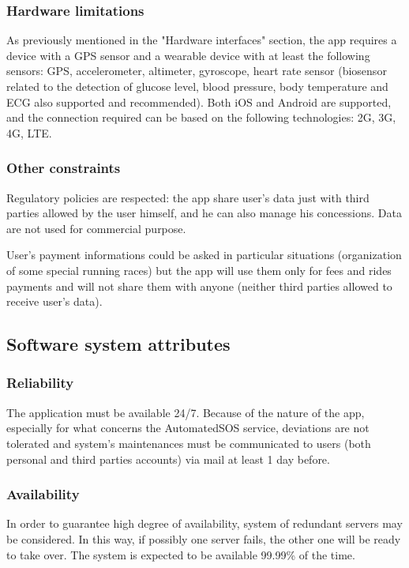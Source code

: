 \subsubsection{Hardware limitations}
As previously mentioned in the "Hardware interfaces" section, the app requires a device with a GPS sensor and a wearable device with at least the following sensors: GPS, accelerometer, altimeter, gyroscope, heart rate sensor (biosensor related to the detection of glucose level, blood pressure, body temperature and ECG also supported and recommended). Both iOS and Android are supported, and the connection required can be based on the following technologies: 2G, 3G, 4G, LTE.

\subsubsection{Other constraints}
Regulatory policies are respected: the app share user's data just with third parties allowed by the user himself, and he can also manage his concessions. Data are not used for commercial purpose.

User's payment informations could be asked in particular situations (organization of some special running races) but the app will use them only for fees and rides payments and will not share them with anyone (neither third parties allowed to receive user's data).

\subsection{Software system attributes}
\subsubsection{Reliability}
The application must be available 24/7. Because of the nature of the app, especially for what concerns the AutomatedSOS service, deviations are not tolerated and system's maintenances must be communicated to users (both personal and third parties accounts) via mail at least 1 day before.

\subsubsection{Availability}
In order to guarantee high degree of availability, system of redundant servers may be considered. In this way, if possibly one server fails, the other one will be ready to take over. The system is expected to be
available 99.99\% of the time.

